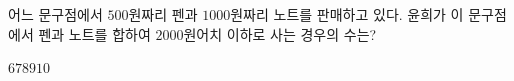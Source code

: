 \hspace*{2mm}\begin{minipage}[t]{\dimexpr\linewidth-2mm\relax}\vspace{0pt}
어느 문구점에서 $500$원짜리 펜과 $1000$원짜리 노트를 판매하고 있다. 윤희가 이 문구점에서 펜과 노트를 합하여 $2000$원어치 이하로 사는 경우의 수는? 
\begin{choices32}{$6$}{$7$}{$8$}{$9$}{$10$}\end{choices32}\end{minipage}
